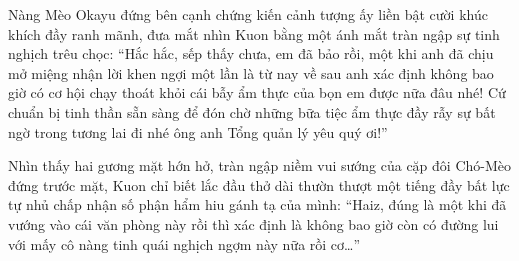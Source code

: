 \documentclass[../main.tex]{subfiles}
\begin{document}
Nàng Mèo Okayu đứng bên cạnh chứng kiến cảnh tượng ấy liền bật cười khúc khích đầy ranh mãnh, đưa mắt nhìn Kuon bằng một ánh mắt tràn ngập sự tinh nghịch trêu chọc: ``Hắc hắc, sếp thấy chưa, em đã bảo rồi, một khi anh đã chịu mở miệng nhận lời khen ngợi một lần là từ nay về sau anh xác định không bao giờ có cơ hội chạy thoát khỏi cái bẫy ẩm thực của bọn em được nữa đâu nhé! Cứ chuẩn bị tinh thần sẵn sàng để đón chờ những bữa tiệc ẩm thực đầy rẫy sự bất ngờ trong tương lai đi nhé ông anh Tổng quản lý yêu quý ơi!''

Nhìn thấy hai gương mặt hớn hở, tràn ngập niềm vui sướng của cặp đôi Chó-Mèo đứng trước mặt, Kuon chỉ biết lắc đầu thở dài thườn thượt một tiếng đầy bất lực tự nhủ chấp nhận số phận hẩm hiu gánh tạ của mình: ``Haiz, đúng là một khi đã vướng vào cái văn phòng này rồi thì xác định là không bao giờ còn có đường lui với mấy cô nàng tinh quái nghịch ngợm này nữa rồi cơ\dots''
\end{document}
